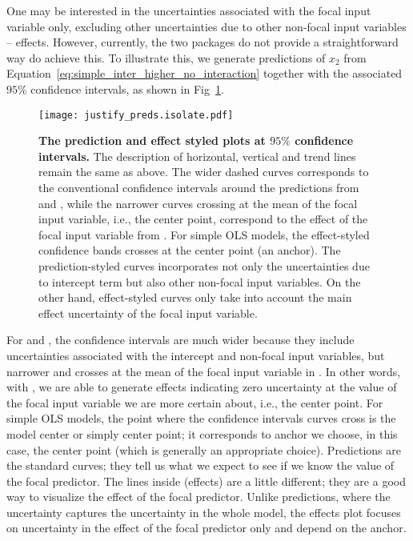 One may be interested in the uncertainties associated with the focal input variable only, excluding other uncertainties due to other non-focal input variables -- effects. However, currently, the two packages do not provide a straightforward way do achieve this. To illustrate this, we generate predictions of $x_2$ from Equation~\ref{eq:simple_inter_higher_no_interaction} together with the associated $95\%$ confidence intervals, as shown in Fig~\ref{fig:justify_ci_plots}. 

\begin{figure}
\begin{center}
\texttt{[image: justify\_preds.isolate.pdf]}
\end{center}
\caption{{\bf The prediction and effect styled plots at $95\%$ confidence intervals.} The description of horizontal, vertical and trend lines remain the same as above. The wider dashed curves corresponds to the conventional confidence intervals around the predictions from  and , while the narrower curves crossing at the mean of the focal input variable, i.e., the center point, correspond to the effect of the focal input variable from . For simple OLS models, the effect-styled confidence bands crosses at the center point (an anchor). The prediction-styled curves incorporates not only the uncertainties due to intercept term but also other non-focal input variables. On the other hand, effect-styled curves only take into account the main effect uncertainty of the focal input variable.}
\label{fig:justify_ci_plots}
\end{figure}

For  and , the confidence intervals are much wider because they include uncertainties associated with the intercept and non-focal input variables, but narrower and crosses at the mean of the focal input variable in . In other words, with , we are able to generate effects indicating zero uncertainty at the value of the focal input variable we are more certain about, i.e., the center point. For simple OLS models, the point where the confidence intervals curves cross is the model center or simply center point; it corresponds to anchor we choose, in this case, the center point (which is generally an appropriate choice). Predictions are the standard curves; they tell us what we expect to see if we know the value of the focal predictor. The lines inside (effects) are a little different; they are a good way to visualize the effect of the focal predictor. Unlike predictions, where the uncertainty captures the uncertainty in the whole model, the effects plot focuses on uncertainty in the effect of the focal predictor only and depend on the anchor.

